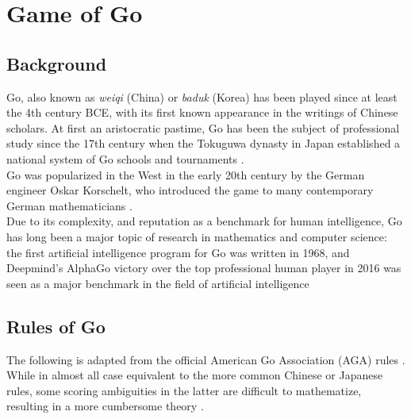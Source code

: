 \documentclass[../math194_paper.tex]{subfiles}
\begin{document}
\section{Game of Go}

\subsection{Background}
Go, also known as \textit{weiqi} (China) or \textit{baduk} (Korea) has been played 
since at least the 4th century BCE, with its first known appearance in the writings 
of Chinese scholars. At first an aristocratic pastime, Go has been the subject of 
professional study since the 17th century when the Tokuguwa dynasty in Japan established 
a national system of Go schools and tournaments \cite{agahistory}.\\

Go was popularized in the West in the early 20th century by the German engineer Oskar 
Korschelt, who introduced the game to many contemporary German mathematicians \cite{korschelt2012theory}.\\

Due to its complexity, and reputation as a benchmark for human intelligence,
Go has long been a major topic of research in mathematics and computer science: the first
artificial intelligence program for Go was written in 1968, and Deepmind's AlphaGo victory 
over the top professional human player in 2016 was seen as a major benchmark in the field 
of artificial intelligence 
    
\subsection{Rules of Go}

The following is adapted from the official American Go Association (AGA) rules
\cite{agarules}. While in almost all case equivalent to the more common Chinese 
or Japanese rules, some scoring ambiguities in the latter are difficult to mathematize,
resulting in a more cumbersome theory \cite[Appendix. 1]{berlekamp1994mathematical}. 
\end{document}
